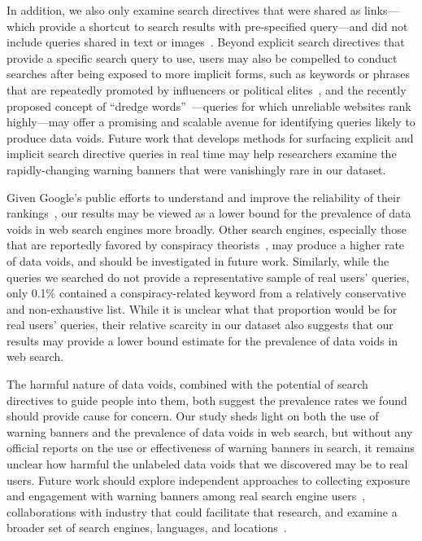 In addition, we also only examine search directives that were shared as links---which provide a shortcut to search results with pre-specified query---and did not include queries shared in text or images~\citep{robertson2023identifying}. 
Beyond explicit search directives that provide a specific search query to use, users may also be compelled to conduct searches after being exposed to more implicit forms, such as keywords or phrases that are repeatedly promoted by influencers or political elites~\citep{tripodi2019devin}, 
and the recently proposed concept of ``dredge words''~\citep{williams2024dredge}---queries for which unreliable websites rank highly---may offer a promising and scalable avenue for identifying queries likely to produce data voids.
Future work that develops methods for surfacing explicit and implicit search directive queries in real time may help researchers examine the rapidly-changing warning banners that were vanishingly rare in our dataset.

Given Google's public efforts to understand and improve the reliability of their rankings~\citep{google2023search}, our results may be viewed as a lower bound for the prevalence of data voids in web search engines more broadly. 
Other search engines, especially those that are reportedly favored by conspiracy theorists~\citep{thompson2022fed}, may produce a higher rate of data voids,
and should be investigated in future work. 
Similarly, while the queries we searched do not provide a representative sample of real users' queries, only 0.1\% contained a conspiracy-related keyword from a relatively conservative and non-exhaustive list. 
While it is unclear what that proportion would be for real users' queries, their relative scarcity in our dataset also suggests that our results may provide a lower bound estimate for the prevalence of data voids in web search.

The harmful nature of data voids, combined with the potential of search directives to guide people into them, both suggest the prevalence rates we found should provide cause for concern.
Our study sheds light on both the use of warning banners and the prevalence of data voids in web search, but without any official reports on the use or effectiveness of warning banners in search, it remains unclear how harmful the unlabeled data voids that we discovered may be to real users.
Future work should explore independent approaches to collecting exposure and engagement with warning banners among real search engine users~\citep{feal2024introduction}, collaborations with industry that could facilitate that research, and examine a broader set of search engines, languages, and locations~\citep{borge2021how}.

